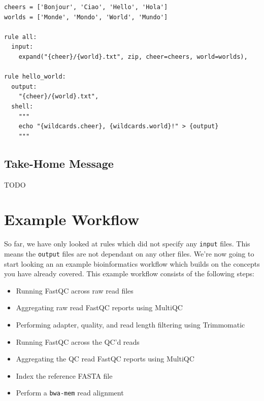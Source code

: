 \begin{bonus}
\begin{lstlisting}
cheers = ['Bonjour', 'Ciao', 'Hello', 'Hola']
worlds = ['Monde', 'Mondo', 'World', 'Mundo']

rule all:
  input:
    expand("{cheer}/{world}.txt", zip, cheer=cheers, world=worlds),

rule hello_world:
  output:
    "{cheer}/{world}.txt",
  shell:
    """
    echo "{wildcards.cheer}, {wildcards.world}!" > {output}
    """
\end{lstlisting}

\end{bonus}

\subsection{Take-Home Message}

TODO











\section{Example Workflow}

So far, we have only looked at rules which did not specify any \texttt{input} files. This means the \texttt{output} files are not dependant on any other files.
We're now going to start looking an an example bioinformatics workflow which builds on the concepts you have already covered. This example workflow consists
of the following steps:

\begin{itemize}
  \item Running FastQC across raw read files
  \item Aggregating raw read FastQC reports using MultiQC
  \item Performing adapter, quality, and read length filtering using Trimmomatic
  \item Running FastQC across the QC'd reads
  \item Aggregating the QC read FastQC reports using MultiQC
  \item Index the reference FASTA file
  \item Perform a \texttt{bwa-mem} read alignment
\end{itemize}

